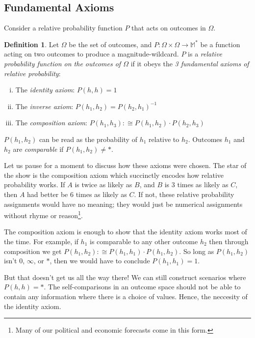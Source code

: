 \documentclass[twoside]{article}
\theoremstyle{plain}%
\theoremstyle{definition}
\newtheorem{definition}{Definition}[section]
\theoremstyle{remark}
\begin{document}
\subsection{Fundamental Axioms}

Consider a relative probability function \(P\) that acts on outcomes in \(\Omega\).

\begin{definition}
\label{def:fundamental_laws}
Let \(\Omega\) be the set of outcomes, and \(P: \Omega \times \Omega \rightarrow \mathbb{M}^*\) be a function acting on two outcomes to produce a magnitude-wildcard. \(P\) is a \textit{relative probability function on the outcomes of \(\Omega\)} if it obeys the \textit{3 fundamental axioms of relative probability}:

\begin{enumerate}[(i)]
\item The \textit{identity axiom}: \(P(h, h) = 1\)
\item The \textit{inverse axiom}: \(P(h_1, h_2) = P(h_2, h_1)^{-1}\)
\item The \textit{composition axiom}: \(P(h_1, h_3) :\cong P(h_1, h_2) \cdot P(h_2, h_3)\)
\end{enumerate}

\end{definition}

\(P(h_1, h_2)\) can be read as the probability of \(h_1\) relative to \(h_2\). Outcomes \(h_1\) and \(h_2\) are \textit{comparable} if \(P(h_1, h_2) \neq \ast\).

Let us pause for a moment to discuss how these axioms were chosen. The star of the show is the composition axiom which succinctly encodes how relative probability works. If \(A\) is twice as likely as \(B\), and \(B\) is 3 times as likely as \(C\), then \(A\) had better be 6 times as likely as \(C\). If not, these relative probability assignments would have no meaning; they would just be numerical assignments without rhyme or reason\footnote{Many of our political and economic forecasts come in this form.}.

The composition axiom is enough to show that the identity axiom works most of the time. For example, if \(h_1\) is comparable to any other outcome \(h_2\) then through composition we get \(P(h_1, h_2) :\cong P(h_1, h_1) \cdot P(h_1, h_2)\). So long as \(P(h_1, h_2)\) isn't \(0\), \(\infty\), or \(\ast\), then we would have to conclude \(P(h_1, h_1) = 1\).

But that doesn't get us all the way there! We can still construct scenarios where \(P(h, h) = \ast\). The self-comparisons in an outcome space should not be able to contain any information where there is a choice of values. Hence, the neccesity of the identity axiom.
\end{document}
